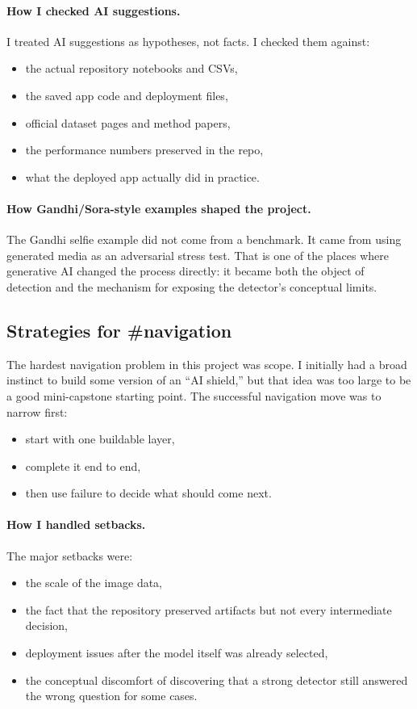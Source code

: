 \documentclass[11pt]{article}
\begin{document}
\paragraph{How I checked AI suggestions.}
I treated AI suggestions as hypotheses, not facts. I checked them against:
\begin{itemize}[leftmargin=1.5em]
    \item the actual repository notebooks and CSVs,
    \item the saved app code and deployment files,
    \item official dataset pages and method papers,
    \item the performance numbers preserved in the repo,
    \item what the deployed app actually did in practice.
\end{itemize}

\paragraph{How Gandhi/Sora-style examples shaped the project.}
The Gandhi selfie example did not come from a benchmark. It came from using generated media as an adversarial stress test. That is one of the places where generative AI changed the process directly: it became both the object of detection and the mechanism for exposing the detector's conceptual limits.

\subsection{Strategies for \#navigation}
The hardest navigation problem in this project was scope. I initially had a broad instinct to build some version of an ``AI shield,'' but that idea was too large to be a good mini-capstone starting point. The successful navigation move was to narrow first:
\begin{itemize}[leftmargin=1.5em]
    \item start with one buildable layer,
    \item complete it end to end,
    \item then use failure to decide what should come next.
\end{itemize}

\paragraph{How I handled setbacks.}
The major setbacks were:
\begin{itemize}[leftmargin=1.5em]
    \item the scale of the image data,
    \item the fact that the repository preserved artifacts but not every intermediate decision,
    \item deployment issues after the model itself was already selected,
    \item the conceptual discomfort of discovering that a strong detector still answered the wrong question for some cases.
\end{itemize}
\end{document}

